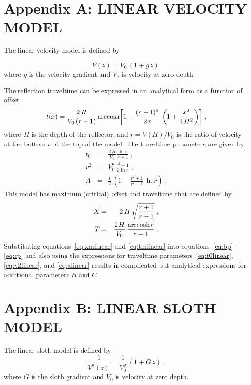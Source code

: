 \appendix
\section{Appendix A: LINEAR VELOCITY MODEL}

The linear velocity model is defined by 

\begin{equation}
\label{eq:linear}
V(z) = V_0\,(1+g\,z)\,
\end{equation}
where $g$ is the velocity gradient and $V_0$ is velocity at zero depth.

The reflection traveltime can be expressed in an analytical form as a
function of offset \cite[]{LSC00-00-02680268}
\begin{equation}
  t(x) = {\frac{2\,H}{V_0\,(r-1)}}\,
  {\mbox{arccosh}{\left[1 + \frac{(r-1)^2}{2\,r}\,\left(1+\frac{x^2}{4\,H^2}\right)\right]}}\;,
  \label{eq:tlinear}
\end{equation}
where $H$ is the depth of the reflector, and $r=V(H)/V_0$ is
the ratio of velocity at the bottom and the top of the model. The
traveltime parameters are given by
\begin{eqnarray}
  \label{eq:t0linear}
  t_0 & = & \frac{2\,H}{V_0}\,\frac{\ln{r}}{r-1}\;, \\
  \label{eq:v2linear}
  v^2 & = & V_0^2\,\frac{r^2-1}{2\,\ln{r}}\;, \\
  \label{eq:alinear}
  A & = & \frac{1}{2}\,\left(1-\frac{r^2+1}{r^2-1}\,\ln{r}\right)\;.
\end{eqnarray}
This model has maximum (critical) offset and traveltime that are
defined by
\begin{eqnarray}
  \label{eq:xmlinear}
  X & = & 2\,H\,\sqrt{\frac{r+1}{r-1}}\;, \\
  \label{eq:tmlinear}
  T & = & \frac{2\,H}{V_0}\,\frac{\mbox{arccosh}\,{r}}{r-1}\;.
\end{eqnarray}
Substituting equations~\ref{eq:xmlinear} and \ref{eq:tmlinear} into
equations~\ref{eq:bp}-\ref{eq:cp} and also using the expressions for
traveltime parameters~\ref{eq:t0linear}, \ref{eq:v2linear}, and
\ref{eq:alinear} results in complicated but analytical expressions for
additional parameters $B$ and $C$.

\appendix
\section{Appendix B: LINEAR SLOTH MODEL}

The linear sloth model is defined by 
\begin{equation}
  {\frac{1}{V^2(z)}} = {\frac{1}{V_0^2}}\,(1+G\,z)\;.
  \label{eq:sloth}
\end{equation}
where $G$ is the sloth gradient and $V_0$ is velocity at zero depth.


